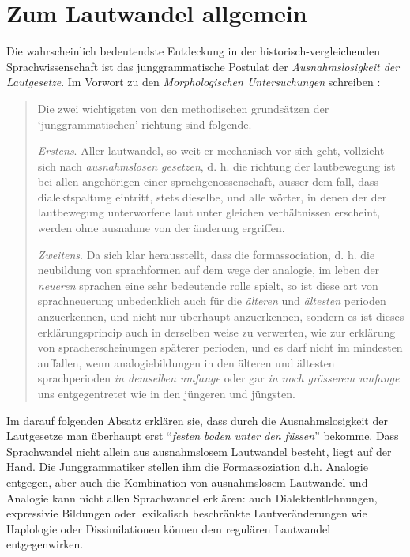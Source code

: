 \documentclass[12pt,a4paper,normalheadings,bibliography=totoc]{scrartcl}
\begin{document}
\section{Zum Lautwandel allgemein}

Die wahrscheinlich bedeutendste Entdeckung
in der historisch-vergleichenden Sprachwissenschaft ist
das junggrammatische Postulat der \emph{Ausnahmslosigkeit der Lautgesetze}.
Im Vorwort zu den \textit{Morphologischen Untersuchungen}
schreiben \textcite[XIII]{brugmann_osthoff}:

\begin{quote}
Die zwei wichtigsten von den methodischen grundsätzen der `junggrammatischen'
richtung sind folgende.

\emph{Erstens}. Aller lautwandel, so weit er mechanisch vor sich geht,
vollzieht sich nach \emph{ausnahmslosen gesetzen},
d. h. die richtung der lautbewegung ist bei allen angehörigen
einer sprachgenossenschaft, ausser dem fall, dass dialektspaltung
eintritt, stets dieselbe, und alle wörter, in denen der der
lautbewegung unterworfene laut unter gleichen verhältnissen erscheint,
werden ohne ausnahme von der änderung ergriffen.

\emph{Zweitens}. Da sich klar herausstellt,
dass die formassociation, d. h. die neubildung von sprachformen auf dem wege
der analogie, im leben der \emph{neueren}
sprachen eine sehr bedeutende rolle spielt,
so ist diese art von sprachneuerung unbedenklich auch für die \emph{älteren}
und \emph{ältesten} perioden anzuerkennen,
und nicht nur überhaupt anzuerkennen, sondern es ist dieses
erklärungsprincip auch in derselben weise zu verwerten,
wie zur erklärung von spracherscheinungen späterer perioden,
und es darf nicht im mindesten auffallen,
wenn analogiebildungen in den älteren und ältesten sprachperioden
\emph{in demselben umfange} oder gar \emph{in noch grösserem umfange}
uns entgegentretet wie in den jüngeren und jüngsten.
\end{quote}

Im darauf folgenden Absatz erklären sie,
dass durch die Ausnahmslosigkeit der Lautgesetze man überhaupt
erst ``\emph{festen boden unter den füssen}'' bekomme.
Dass Sprachwandel nicht allein aus ausnahmslosem Lautwandel besteht,
liegt auf der Hand.
Die Junggrammatiker stellen ihm die Formassoziation d.h. Analogie entgegen,
aber auch die Kombination von ausnahmslosem Lautwandel und Analogie kann nicht 
allen Sprachwandel erklären:
auch Dialektentlehnungen,
expressivie Bildungen
oder lexikalisch beschränkte Lautveränderungen
wie Haplologie oder Dissimilationen
können dem regulären Lautwandel entgegenwirken.
\end{document}

